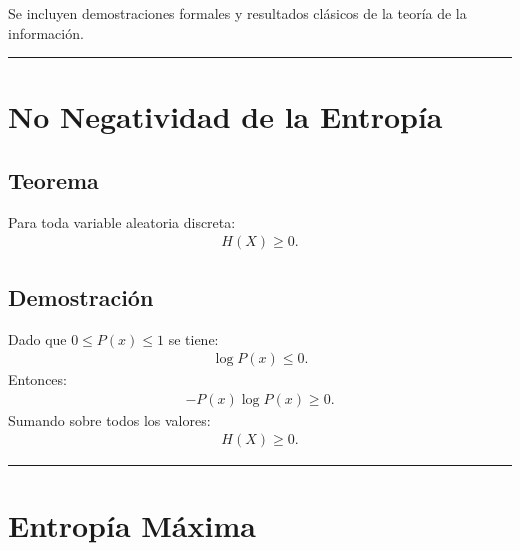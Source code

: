 \documentclass[letterpaper,10pt,english]{jupyterBook}
\begin{document}
\sphinxAtStartPar
Se incluyen demostraciones formales y resultados clásicos de la
teoría de la información.


\bigskip\hrule\bigskip



\section{No Negatividad de la Entropía}
\label{\detokenize{02_mathematical_foundations/properties_theorems:no-negatividad-de-la-entropia}}

\subsection{Teorema}
\label{\detokenize{02_mathematical_foundations/properties_theorems:teorema}}
\sphinxAtStartPar
Para toda variable aleatoria discreta:
\begin{equation*}
\begin{split}
H(X)\ge 0.
\end{split}
\end{equation*}

\subsection{Demostración}
\label{\detokenize{02_mathematical_foundations/properties_theorems:demostracion}}
\sphinxAtStartPar
Dado que \(0\le P(x)\le 1\) se tiene:
\begin{equation*}
\begin{split}
\log P(x)\le 0.
\end{split}
\end{equation*}
\sphinxAtStartPar
Entonces:
\begin{equation*}
\begin{split}
- P(x)\log P(x)\ge 0.
\end{split}
\end{equation*}
\sphinxAtStartPar
Sumando sobre todos los valores:
\begin{equation*}
\begin{split}
H(X)\ge 0.
\end{split}
\end{equation*}

\bigskip\hrule\bigskip



\section{Entropía Máxima}
\label{\detokenize{02_mathematical_foundations/properties_theorems:entropia-maxima}}
\end{document}
